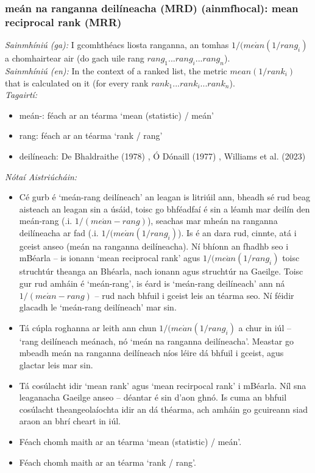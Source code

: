 \documentclass{article}
\begin{document}
\subsubsection*{meán na ranganna deilíneacha (MRD) (ainmfhocal): mean reciprocal rank (MRR)}
 \noindent \textit{Sainmhíniú (ga):} I gcomhthéacs liosta ranganna, an tomhas $1 / (me\acute{a}n(1 / rang_i)$ a chomhairtear air (do gach uile rang $rang_1...rang_i...rang_n$).
\\
 \noindent \textit{Sainmhíniú (en):} In the context of a ranked list, the metric $mean(1 / rank_i)$ that is calculated on it (for every rank $rank_1...rank_i...rank_n$).
\\
 \noindent \textit{Tagairtí:}
\begin{itemize}
	\item meán-: féach ar an téarma `mean (statistic) / meán'
	\item rang: féach ar an téarma `rank / rang'
	\item deilíneach: De Bhaldraithe (1978) \cite{de-bhaldraithe}, Ó Dónaill (1977) \cite{odonaill}, Williams et al. (2023) \cite{storchiste}
\end{itemize}

 \noindent \textit{Nótaí Aistriúcháin:}
\begin{itemize}
	\item Cé gurb é `meán-rang deilíneach' an leagan is litriúil ann, bheadh sé rud beag aisteach an leagan sin a úsáid, toisc go bhféadfaí é sin a léamh mar deilín den meán-rang (.i. $1 / (me\acute{a}n-rang)$), seachas mar mheán na ranganna deilíneacha ar fad (.i. $1 / (me\acute{a}n(1 / rang_i)$). Is é an dara rud, cinnte, atá i gceist anseo (meán na ranganna deilíneacha). Ní bhíonn an fhadhb seo i mBéarla -- is ionann `mean reciprocal rank' agus $1 / (me\acute{a}n(1 / rang_i)$ toisc struchtúr theanga an Bhéarla, nach ionann agus struchtúr na Gaeilge. Toisc gur rud amháin é `meán-rang', is éard is `meán-rang deilíneach' ann ná $1 / (me\acute{a}n-rang)$ -- rud nach bhfuil i gceist leis an téarma seo. Ní féidir glacadh le `meán-rang deilíneach' mar sin.
	\item Tá cúpla roghanna ar leith ann chun $1 / (me\acute{a}n(1 / rang_i)$ a chur in iúl -- `rang deilíneach meánach, nó `meán na ranganna deilíneacha'. Meastar go mbeadh meán na ranganna deilíneach níos léire dá bhfuil i gceist, agus glactar leis mar sin.
	\item Tá cosúlacht idir `mean rank' agus `mean recirpocal rank' i mBéarla. Níl sna leaganacha Gaeilge anseo -- déantar é sin d'aon ghnó. Is cuma an bhfuil cosúlacht theangeolaíochta idir an dá théarma, ach amháin go gcuireann siad araon an bhrí cheart in iúl.
	\item Féach chomh maith ar an téarma `mean (statistic) / meán'.
	\item Féach chomh maith ar an téarma `rank / rang'.
\end{itemize}
\end{document}
